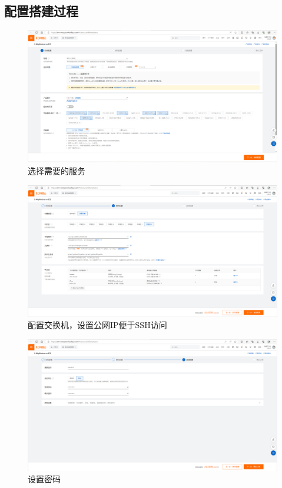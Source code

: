 \subsection{配置搭建过程}
\begin{figure}[H]
  \centering
  \includegraphics[width=\textwidth]{figure/setting1.png}
  \caption{选择需要的服务}
  \label{fig:my_label}
\end{figure}
\begin{figure}[H]
  \centering
  \includegraphics[width=\textwidth]{figure/setting2.png}
  \caption{配置交换机，设置公网IP便于SSH访问}
  \label{fig:my_label}
\end{figure}
\begin{figure}[H]
  \centering
  \includegraphics[width=\textwidth]{figure/setting3.png}
  \caption{设置密码}
  \label{fig:my_label}
\end{figure}
